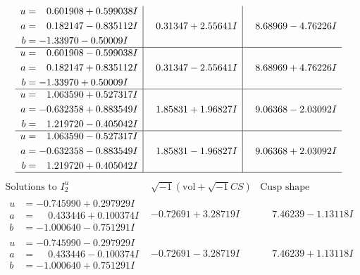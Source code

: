 \documentclass[1p]{elsarticle_modified}
\theoremstyle{definition}
\newcommand{\I}{\sqrt{-1}}
\begin{document}
$$\begin{array}{c|c|c}
\begin{aligned}
u &= \phantom{-}0.601908 + 0.599038 I \\
a &= \phantom{-}0.182147 - 0.835112 I \\
b &= -1.33970 - 0.50009 I\end{aligned}
 & \phantom{-}0.31347 + 2.55641 I & \phantom{-}8.68969 - 4.76226 I \\ \hline\begin{aligned}
u &= \phantom{-}0.601908 - 0.599038 I \\
a &= \phantom{-}0.182147 + 0.835112 I \\
b &= -1.33970 + 0.50009 I\end{aligned}
 & \phantom{-}0.31347 - 2.55641 I & \phantom{-}8.68969 + 4.76226 I \\ \hline\begin{aligned}
u &= \phantom{-}1.063590 + 0.527317 I \\
a &= -0.632358 + 0.883549 I \\
b &= \phantom{-}1.219720 - 0.405042 I\end{aligned}
 & \phantom{-}1.85831 + 1.96827 I & \phantom{-}9.06368 - 2.03092 I \\ \hline\begin{aligned}
u &= \phantom{-}1.063590 - 0.527317 I \\
a &= -0.632358 - 0.883549 I \\
b &= \phantom{-}1.219720 + 0.405042 I\end{aligned}
 & \phantom{-}1.85831 - 1.96827 I & \phantom{-}9.06368 + 2.03092 I\\
 \hline 
 \end{array}$$\newpage$$\begin{array}{c|c|c}  
\text{Solutions to }I^u_{2}& \I (\text{vol} + \sqrt{-1}CS) & \text{Cusp shape}\\
 \hline 
\begin{aligned}
u &= -0.745990 + 0.297929 I \\
a &= \phantom{-}0.433446 + 0.100374 I \\
b &= -1.000640 - 0.751291 I\end{aligned}
 & -0.72691 + 3.28719 I & \phantom{-}7.46239 - 1.13118 I \\ \hline\begin{aligned}
u &= -0.745990 - 0.297929 I \\
a &= \phantom{-}0.433446 - 0.100374 I \\
b &= -1.000640 + 0.751291 I\end{aligned}
 & -0.72691 - 3.28719 I & \phantom{-}7.46239 + 1.13118 I \\ \hline\begin{aligned}

\end{aligned}
\end{array}$$
\end{document}
